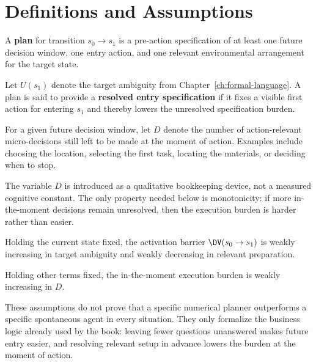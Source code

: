 \section{Definitions and Assumptions}

\begin{definition}[Plan]
A \textbf{plan} for transition $s_0 \to s_1$ is a pre-action specification of
at least one future decision window, one entry action, and one relevant
environmental arrangement for the target state.
\end{definition}

\begin{definition}
Let $U(s_1)$ denote the target ambiguity from
Chapter~\ref{ch:formal-language}. A plan is said to provide a
\textbf{resolved entry specification} if it fixes a visible first action for
entering $s_1$ and thereby lowers the unresolved specification burden.
\end{definition}

\begin{definition}
For a given future decision window, let $D$ denote the number of
action-relevant micro-decisions still left to be made at the moment of action.
Examples include choosing the location, selecting the first task, locating the
materials, or deciding when to stop.
\end{definition}

\begin{remark}
The variable $D$ is introduced as a qualitative bookkeeping device, not a
measured cognitive constant. The only property needed below is monotonicity:
if more in-the-moment decisions remain unresolved, then the execution burden is
harder rather than easier.
\end{remark}

\begin{axiom}
Holding the current state fixed, the activation barrier
$\DV(s_0 \to s_1)$ is weakly increasing in target ambiguity and weakly
decreasing in relevant preparation.
\end{axiom}

\begin{axiom}
Holding other terms fixed, the in-the-moment execution burden is weakly
increasing in $D$.
\end{axiom}

\begin{discussion}
These assumptions do not prove that a specific numerical planner outperforms a
specific spontaneous agent in every situation. They only formalize the business
logic already used by the book: leaving fewer questions unanswered makes future
entry easier, and resolving relevant setup in advance lowers the burden at the
moment of action.
\end{discussion}
